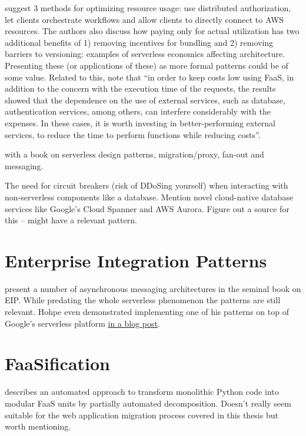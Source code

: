 \textcite{adzic2017serverless} suggest 3 methods for optimizing resource usage: use distributed authorization, let clients orchestrate workflows and allow clients to directly connect to AWS resources. The authors also discuss how paying only for actual utilization has two additional benefits of 1) removing incentives for bundling and 2) removing barriers to versioning: examples of serverless economics affecting architecture. Presenting these (or applications of these) as more formal patterns could be of some value. Related to this, \textcite{albuquerque17faaspaas} note that ``in order to keep costs low using FaaS, in addition to the concern with the execution time of the requests, the results showed that the dependence on the use of external services, such as database, authentication services, among others, can interfere considerably with the expenses. In these cases, it is worth investing in better-performing external services, to reduce the time to perform functions while reducing costs''.

\textcite{zambrano18patterns} with a book on serverless design patterns, migration/proxy, fan-out and messaging.

The need for circuit breakers (risk of DDoSing yourself) when interacting with non-serverless components like a database. Mention novel cloud-native database services like Google's Cloud Spanner and AWS Aurora. Figure out a source for this -- \textcite{hohpe2004enterprise} might have a relevant pattern.

\section{Enterprise Integration Patterns} \label{sec:enterpriseIntegrationPatterns}

\textcite{hohpe2004enterprise} present a number of asynchronous messaging architectures in the seminal book on EIP. While predating the whole serverless phenomenon the patterns are still relevant. Hohpe even demonstrated implementing one of his patterns on top of Google's serverless platform \href{http://www.enterpriseintegrationpatterns.com/ramblings/google_cloud_functions.html}{in a blog post}.

\section{FaaSification} \label{sec:faasification}

\textcite{spillner17transformpython} describes an automated approach to transform monolithic Python code into modular FaaS units by partially automated decomposition. Doesn't really seem suitable for the web application migration process covered in this thesis but worth mentioning.

